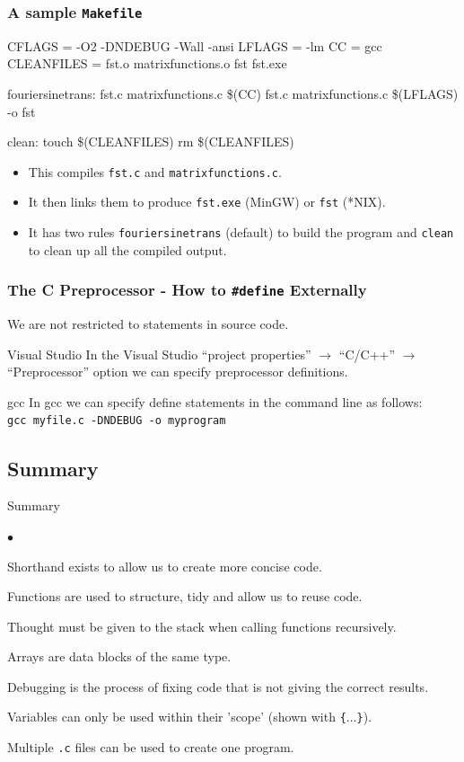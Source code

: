 \documentclass[smaller,handout,table]{beamer}
\begin{document}
\begin{frame}[fragile]
\frametitle{A sample \tt{Makefile}}
\begin{exampleblock}{}
\begin{semiverbatim}
\scriptsize
CFLAGS = -O2 -DNDEBUG -Wall -ansi
LFLAGS = -lm
CC = gcc
CLEANFILES = fst.o matrixfunctions.o fst fst.exe

fouriersinetrans: fst.c matrixfunctions.c
         \$(CC) fst.c matrixfunctions.c \$(LFLAGS) -o fst
         
clean:
        touch \$(CLEANFILES)
        rm \$(CLEANFILES)
\end{semiverbatim}
\end{exampleblock}
\begin{itemize}
\item This compiles {\tt fst.c} and {\tt matrixfunctions.c}.
\item It then links them to produce {\tt fst.exe} (MinGW) or {\tt fst} (*NIX).
\item It has two rules {\tt fouriersinetrans} (default) to build the program and {\tt clean} to clean up all the compiled output.
\end{itemize}
\end{frame}

\begin{frame}
\frametitle{The C Preprocessor - How to {\tt\#define} Externally}
We are not restricted to {\tt {}} statements in source code.
\begin{block}{Visual Studio}
In the Visual Studio ``project properties'' $\rightarrow$ ``C/C++'' $\rightarrow$ ``Preprocessor'' option we can specify preprocessor definitions.
\end{block}

\begin{block}{gcc}
In gcc we can specify define statements in the command line as follows:\\
{\tt gcc myfile.c -DNDEBUG -o myprogram }
\end{block}
\end{frame}

\subsection{Summary}
\begin{frame}{Summary}
\begin{list}{$\bullet$}{}
\item Shorthand exists to allow us to create more concise code.
\item Functions are used to structure, tidy and allow us to reuse code.
\item Thought must be given to the stack when calling functions recursively.
\item Arrays are data blocks of the same type.
\item Debugging is the process of fixing code that is not giving the correct results.
\item Variables can only be used within their 'scope' (shown with \texttt{\{$\ldots$\}}).
\item Multiple \texttt{.c} files can be used to create one program.
\end{list}
\end{frame}
\end{document}

